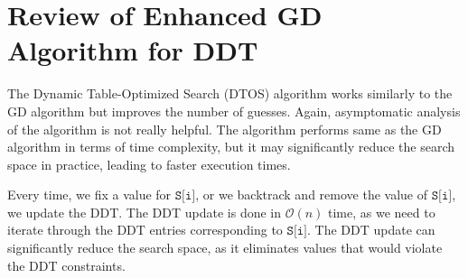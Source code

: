 \documentclass{article}
\begin{document}
\section{Review of Enhanced GD Algorithm for DDT}

The Dynamic Table-Optimized Search (DTOS) algorithm works similarly to the GD algorithm but improves the number of guesses.
Again, asymptomatic analysis of the algorithm is not really helpful.
The algorithm performs same as the GD algorithm in terms of time complexity, but it may significantly reduce the search space in practice, leading to faster execution times.

Every time, we fix a value for $\texttt{S[i]}$, or we backtrack and remove the value of $\texttt{S[i]}$, we update the DDT.
The DDT update is done in $\mathcal{O}(n)$ time, as we need to iterate through the DDT entries corresponding to $\texttt{S[i]}$.
The DDT update can significantly reduce the search space, as it eliminates values that would violate the DDT constraints.
\end{document}
